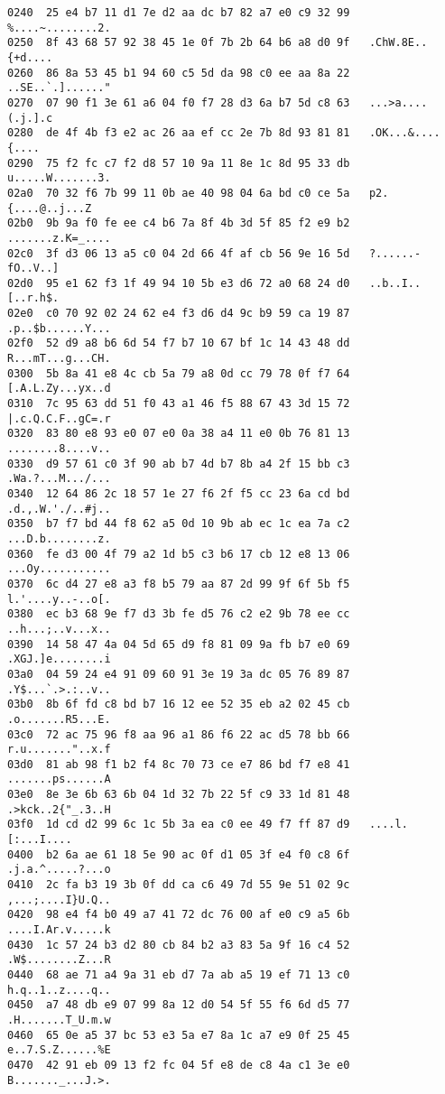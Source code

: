 \begin{lstlisting}
0240  25 e4 b7 11 d1 7e d2 aa dc b7 82 a7 e0 c9 32 99   %....~........2.
0250  8f 43 68 57 92 38 45 1e 0f 7b 2b 64 b6 a8 d0 9f   .ChW.8E..{+d....
0260  86 8a 53 45 b1 94 60 c5 5d da 98 c0 ee aa 8a 22   ..SE..`.]......"
0270  07 90 f1 3e 61 a6 04 f0 f7 28 d3 6a b7 5d c8 63   ...>a....(.j.].c
0280  de 4f 4b f3 e2 ac 26 aa ef cc 2e 7b 8d 93 81 81   .OK...&....{....
0290  75 f2 fc c7 f2 d8 57 10 9a 11 8e 1c 8d 95 33 db   u.....W.......3.
02a0  70 32 f6 7b 99 11 0b ae 40 98 04 6a bd c0 ce 5a   p2.{....@..j...Z
02b0  9b 9a f0 fe ee c4 b6 7a 8f 4b 3d 5f 85 f2 e9 b2   .......z.K=_....
02c0  3f d3 06 13 a5 c0 04 2d 66 4f af cb 56 9e 16 5d   ?......-fO..V..]
02d0  95 e1 62 f3 1f 49 94 10 5b e3 d6 72 a0 68 24 d0   ..b..I..[..r.h$.
02e0  c0 70 92 02 24 62 e4 f3 d6 d4 9c b9 59 ca 19 87   .p..$b......Y...
02f0  52 d9 a8 b6 6d 54 f7 b7 10 67 bf 1c 14 43 48 dd   R...mT...g...CH.
0300  5b 8a 41 e8 4c cb 5a 79 a8 0d cc 79 78 0f f7 64   [.A.L.Zy...yx..d
0310  7c 95 63 dd 51 f0 43 a1 46 f5 88 67 43 3d 15 72   |.c.Q.C.F..gC=.r
0320  83 80 e8 93 e0 07 e0 0a 38 a4 11 e0 0b 76 81 13   ........8....v..
0330  d9 57 61 c0 3f 90 ab b7 4d b7 8b a4 2f 15 bb c3   .Wa.?...M.../...
0340  12 64 86 2c 18 57 1e 27 f6 2f f5 cc 23 6a cd bd   .d.,.W.'./..#j..
0350  b7 f7 bd 44 f8 62 a5 0d 10 9b ab ec 1c ea 7a c2   ...D.b........z.
0360  fe d3 00 4f 79 a2 1d b5 c3 b6 17 cb 12 e8 13 06   ...Oy...........
0370  6c d4 27 e8 a3 f8 b5 79 aa 87 2d 99 9f 6f 5b f5   l.'....y..-..o[.
0380  ec b3 68 9e f7 d3 3b fe d5 76 c2 e2 9b 78 ee cc   ..h...;..v...x..
0390  14 58 47 4a 04 5d 65 d9 f8 81 09 9a fb b7 e0 69   .XGJ.]e........i
03a0  04 59 24 e4 91 09 60 91 3e 19 3a dc 05 76 89 87   .Y$...`.>.:..v..
03b0  8b 6f fd c8 bd b7 16 12 ee 52 35 eb a2 02 45 cb   .o.......R5...E.
03c0  72 ac 75 96 f8 aa 96 a1 86 f6 22 ac d5 78 bb 66   r.u......."..x.f
03d0  81 ab 98 f1 b2 f4 8c 70 73 ce e7 86 bd f7 e8 41   .......ps......A
03e0  8e 3e 6b 63 6b 04 1d 32 7b 22 5f c9 33 1d 81 48   .>kck..2{"_.3..H
03f0  1d cd d2 99 6c 1c 5b 3a ea c0 ee 49 f7 ff 87 d9   ....l.[:...I....
0400  b2 6a ae 61 18 5e 90 ac 0f d1 05 3f e4 f0 c8 6f   .j.a.^.....?...o
0410  2c fa b3 19 3b 0f dd ca c6 49 7d 55 9e 51 02 9c   ,...;....I}U.Q..
0420  98 e4 f4 b0 49 a7 41 72 dc 76 00 af e0 c9 a5 6b   ....I.Ar.v.....k
0430  1c 57 24 b3 d2 80 cb 84 b2 a3 83 5a 9f 16 c4 52   .W$........Z...R
0440  68 ae 71 a4 9a 31 eb d7 7a ab a5 19 ef 71 13 c0   h.q..1..z....q..
0450  a7 48 db e9 07 99 8a 12 d0 54 5f 55 f6 6d d5 77   .H.......T_U.m.w
0460  65 0e a5 37 bc 53 e3 5a e7 8a 1c a7 e9 0f 25 45   e..7.S.Z......%E
0470  42 91 eb 09 13 f2 fc 04 5f e8 de c8 4a c1 3e e0   B......._...J.>.

\end{lstlisting}
